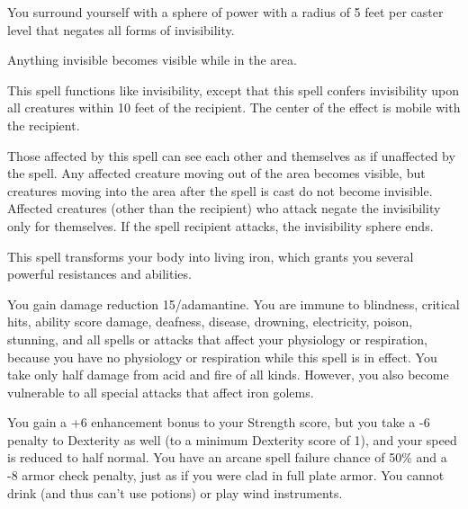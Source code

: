 \begin{multicols}{2}
\begin{small}

\noindent You surround yourself with a sphere of power with a radius of 5 feet per caster level that negates all forms of invisibility.

\smallskip\noindent Anything invisible becomes visible while in the area.

\noindent This spell functions like invisibility, except that this spell confers invisibility upon all creatures within 10 feet of the recipient. The center of the effect is mobile with the recipient.

\smallskip\noindent Those affected by this spell can see each other and themselves as if unaffected by the spell. Any affected creature moving out of the area becomes visible, but creatures moving into the area after the spell is cast do not become invisible. Affected creatures (other than the recipient) who attack negate the invisibility only for themselves. If the spell recipient attacks, the invisibility sphere ends.

\noindent This spell transforms your body into living iron, which grants you several powerful resistances and abilities.

\smallskip\noindent You gain damage reduction 15/adamantine. You are immune to blindness, critical hits, ability score damage, deafness, disease, drowning, electricity, poison, stunning, and all spells or attacks that affect your physiology or respiration, because you have no physiology or respiration while this spell is in effect. You take only half damage from acid and fire of all kinds. However, you also become vulnerable to all special attacks that affect iron golems.

\smallskip\noindent You gain a +6 enhancement bonus to your Strength score, but you take a -6 penalty to Dexterity as well (to a minimum Dexterity score of 1), and your speed is reduced to half normal. You have an arcane spell failure chance of 50\% and a -8 armor check penalty, just as if you were clad in full plate armor. You cannot drink (and thus can't use potions) or play wind instruments.


\end{small}
\end{multicols}
